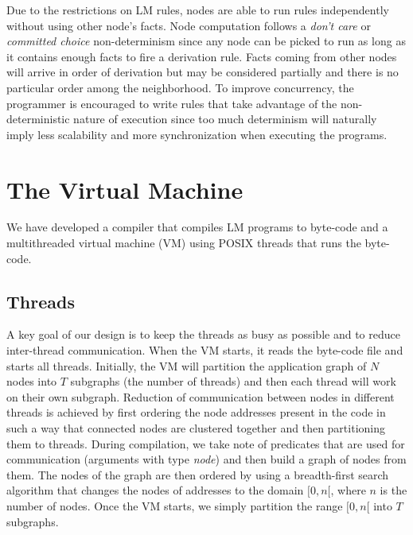 \documentclass{sigplanconf}
\begin{document}
Due to the restrictions on LM rules, nodes are able to run rules
independently without using other node's facts. Node computation
follows a \emph{don't care} or \emph{committed choice} non-determinism
since any node can be picked to run as long as it contains enough
facts to fire a derivation rule.  Facts coming from other nodes will
arrive in order of derivation but may be considered partially and
there is no particular order among the neighborhood. To improve
concurrency, the programmer is encouraged to write rules that take
advantage of the non-deterministic nature of execution since too much
determinism will naturally imply less scalability and more synchronization
when executing the programs.
 
\makeatletter{}\section{The Virtual Machine}
\label{virtual_machine}

We have developed a compiler that compiles LM programs to byte-code
and a multithreaded virtual machine (VM) using POSIX threads
that runs the byte-code.


\subsection{Threads}

A key goal of our design is to keep the threads as busy as possible
and to reduce inter-thread communication. When the VM starts, it reads
the byte-code file and starts all threads. Initially, the VM will
partition the application graph of $N$ nodes into $T$ subgraphs (the
number of threads) and then each thread will work on their own
subgraph. Reduction of communication between nodes in different threads
is achieved by first ordering the node addresses present in the code in such a way that
connected nodes are clustered together and then partitioning them to
threads. During compilation, we take note of predicates that are used
for communication (arguments with type \emph{node}) and
then build a graph of nodes from them. The nodes of
the graph are then ordered by using a breadth-first search algorithm
that changes the nodes of addresses to the domain $[0, n[$, where $n$
is the number of nodes. Once the VM starts, we simply partition the
range $[0, n[$ into $T$ subgraphs.
\end{document}

